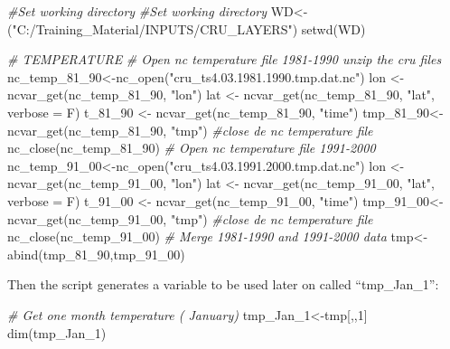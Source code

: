 \documentclass[
  10pt,
  b5paper,
]{book}
\newenvironment{Shaded}{\begin{snugshade}}{\end{snugshade}}
\newcommand{\AttributeTok}[1]{\textcolor[rgb]{0.77,0.63,0.00}{#1}}
\newcommand{\CommentTok}[1]{\textcolor[rgb]{0.56,0.35,0.01}{\textit{#1}}}
\newcommand{\DecValTok}[1]{\textcolor[rgb]{0.00,0.00,0.81}{#1}}
\newcommand{\FunctionTok}[1]{\textcolor[rgb]{0.00,0.00,0.00}{#1}}
\newcommand{\NormalTok}[1]{#1}
\newcommand{\OtherTok}[1]{\textcolor[rgb]{0.56,0.35,0.01}{#1}}
\newcommand{\StringTok}[1]{\textcolor[rgb]{0.31,0.60,0.02}{#1}}
\begin{document}
\begin{Shaded}
\begin{Highlighting}[]
\CommentTok{\#Set working directory}
\CommentTok{\#Set working directory}
\NormalTok{WD}\OtherTok{\textless{}{-}}\NormalTok{(}\StringTok{"C:/Training\_Material/INPUTS/CRU\_LAYERS"}\NormalTok{)}
\FunctionTok{setwd}\NormalTok{(WD)}

\CommentTok{\# TEMPERATURE}
\CommentTok{\# Open nc temperature file 1981{-}1990 unzip the cru files}
\NormalTok{nc\_temp\_81\_90}\OtherTok{\textless{}{-}}\FunctionTok{nc\_open}\NormalTok{(}\StringTok{"cru\_ts4.03.1981.1990.tmp.dat.nc"}\NormalTok{)}
\NormalTok{lon }\OtherTok{\textless{}{-}} \FunctionTok{ncvar\_get}\NormalTok{(nc\_temp\_81\_90, }\StringTok{"lon"}\NormalTok{)}
\NormalTok{lat }\OtherTok{\textless{}{-}} \FunctionTok{ncvar\_get}\NormalTok{(nc\_temp\_81\_90, }\StringTok{"lat"}\NormalTok{, }\AttributeTok{verbose =}\NormalTok{ F)}
\NormalTok{t\_81\_90 }\OtherTok{\textless{}{-}} \FunctionTok{ncvar\_get}\NormalTok{(nc\_temp\_81\_90, }\StringTok{"time"}\NormalTok{)}
\NormalTok{tmp\_81\_90}\OtherTok{\textless{}{-}}\FunctionTok{ncvar\_get}\NormalTok{(nc\_temp\_81\_90, }\StringTok{"tmp"}\NormalTok{)}
\CommentTok{\#close de nc temperature file}
\FunctionTok{nc\_close}\NormalTok{(nc\_temp\_81\_90) }
\CommentTok{\# Open nc temperature file 1991{-}2000}
\NormalTok{nc\_temp\_91\_00}\OtherTok{\textless{}{-}}\FunctionTok{nc\_open}\NormalTok{(}\StringTok{"cru\_ts4.03.1991.2000.tmp.dat.nc"}\NormalTok{)}
\NormalTok{lon }\OtherTok{\textless{}{-}} \FunctionTok{ncvar\_get}\NormalTok{(nc\_temp\_91\_00, }\StringTok{"lon"}\NormalTok{)}
\NormalTok{lat }\OtherTok{\textless{}{-}} \FunctionTok{ncvar\_get}\NormalTok{(nc\_temp\_91\_00, }\StringTok{"lat"}\NormalTok{, }\AttributeTok{verbose =}\NormalTok{ F)}
\NormalTok{t\_91\_00 }\OtherTok{\textless{}{-}} \FunctionTok{ncvar\_get}\NormalTok{(nc\_temp\_91\_00, }\StringTok{"time"}\NormalTok{)}
\NormalTok{tmp\_91\_00}\OtherTok{\textless{}{-}}\FunctionTok{ncvar\_get}\NormalTok{(nc\_temp\_91\_00, }\StringTok{"tmp"}\NormalTok{)}
\CommentTok{\#close de nc temperature file}
\FunctionTok{nc\_close}\NormalTok{(nc\_temp\_91\_00) }
\CommentTok{\# Merge 1981{-}1990 and 1991{-}2000 data }
\NormalTok{tmp}\OtherTok{\textless{}{-}}\FunctionTok{abind}\NormalTok{(tmp\_81\_90,tmp\_91\_00)}
\end{Highlighting}
\end{Shaded}

Then the script generates a variable to be used later on called ``tmp\_Jan\_1'':

\begin{Shaded}
\begin{Highlighting}[]
\CommentTok{\# Get one month temperature ( January)}
\NormalTok{ tmp\_Jan\_1}\OtherTok{\textless{}{-}}\NormalTok{tmp[,,}\DecValTok{1}\NormalTok{]}
 \FunctionTok{dim}\NormalTok{(tmp\_Jan\_1)}
\end{Highlighting}
\end{Shaded}
\end{document}
